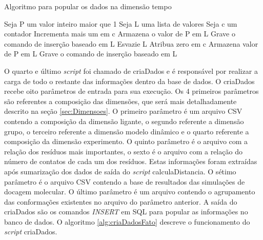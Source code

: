 \begin{algorithm}[H]
\caption{Algoritmo para popular os dados na dimensão tempo}
\label{alg:criaDadosDIMTempo}
{\fontsize{10}{10}\selectfont
\begin{algorithmic}[1]
	\STATE Seja P um valor inteiro maior que 1
	\STATE Seja L uma lista de valores
	\STATE Seja c um contador
		\STATE Incrementa mais um em c
			\STATE Armazena o valor de P em L
			\STATE Grave o comando de inserção baseado em L
			\STATE Esvazie L
			\STATE Atribua zero em c
		\ELSE
			\STATE Armazena valor de P em L
		\ENDIF
	\ENDFOR
		\STATE Grave o comando de inserção baseado em L
	\ENDIF
\end{algorithmic}
}
\end{algorithm}

O quarto e último \emph{script} foi chamado de criaDados e é responsável por realizar a carga de todo o restante das informações dentro da base de dados. O criaDados recebe oito parâmetros de entrada para sua execução. Os 4 primeiros parâmetros são referentes a composição das dimensões, que será mais detalhadamente descrito na seção \ref{sec:Dimensoes}. O primeiro parâmetro é um arquivo CSV contendo a composição da dimensão ligante, o segundo referente a dimensão grupo, o terceiro referente a dimensão modelo dinâmico e o quarto referente a composição da dimensão experimento. O quinto parâmetro é o arquivo com a relação dos resíduos mais importantes, o sexto é o arquivo com a relação do número de contatos de cada um dos resíduos. Estas informações foram extraídas após sumarização dos dados de saída do \emph{script} calculaDistancia. O sétimo parâmetro é o arquivo CSV contendo a base de resultados das simulações de docagem molecular. O último parâmetro é um arquivo contendo o agrupamento das conformações existentes no arquivo do parâmetro anterior. A saída do criaDados são os comandos \emph{INSERT} em SQL para popular as informações no banco de dados. O algoritmo \ref{alg:criaDadosFato} descreve o funcionamento do \emph{script} criaDados.

